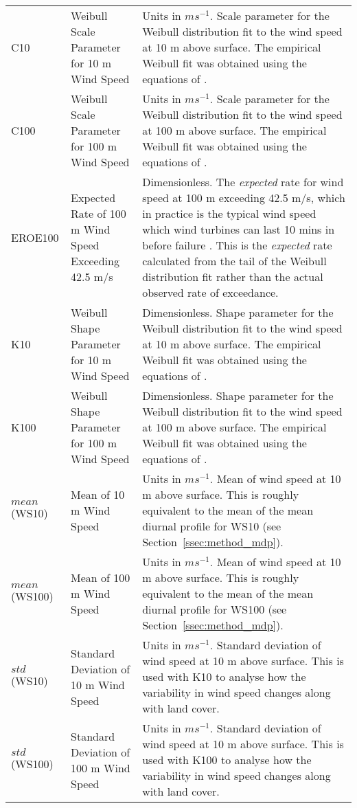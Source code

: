\begin{landscape}
\begin{longtable}{P{2cm}P{3cm}P{15cm}}
			C10 & Weibull Scale Parameter for 10 m Wind Speed & Units in $m s^{-1}$. Scale parameter for the Weibull distribution fit to the wind speed at 10 m above surface. The empirical Weibull fit was obtained using the equations of \citep{justus1977}. \\
			C100 & Weibull Scale Parameter for 100 m Wind Speed & Units in $m s^{-1}$. Scale parameter for the Weibull distribution fit to the wind speed at 100 m above surface. The empirical Weibull fit was obtained using the equations of \citep{justus1977}. \\
			EROE100 & Expected Rate of 100 m Wind Speed Exceeding 42.5 m/s & Dimensionless. The \textit{expected} rate for wind speed at 100 m exceeding 42.5 m/s, which in practice is the typical wind speed which wind turbines can last 10 mins in before failure \citep{chen2015, chen2016, ge_web}. This is the \textit{expected} rate calculated from the tail of the Weibull distribution fit rather than the actual observed rate of exceedance. \\
			K10 & Weibull Shape Parameter for 10 m Wind Speed & Dimensionless. Shape parameter for the Weibull distribution fit to the wind speed at 10 m above surface. The empirical Weibull fit was obtained using the equations of \citep{justus1977}. \\
			K100 & Weibull Shape Parameter for 100 m Wind Speed & Dimensionless. Shape parameter for the Weibull distribution fit to the wind speed at 100 m above surface. The empirical Weibull fit was obtained using the equations of \citep{justus1977}. \\
			$mean$(WS10) & Mean of 10 m Wind Speed & Units in $m s^{-1}$. Mean of wind speed at 10 m above surface. This is roughly equivalent to the mean of the mean diurnal profile for WS10 (see Section~\ref{ssec:method_mdp}). \\
			$mean$(WS100) & Mean of 100 m Wind Speed & Units in $m s^{-1}$. Mean of wind speed at 10 m above surface. This is roughly equivalent to the mean of the mean diurnal profile for WS100 (see Section~\ref{ssec:method_mdp}). \\
			$std$(WS10) & Standard Deviation of 10 m Wind Speed & Units in $m s^{-1}$. Standard deviation of wind speed at 10 m above surface. This is used with K10 to analyse how the variability in wind speed changes along with land cover. \\
			$std$(WS100) & Standard Deviation of 100 m Wind Speed & Units in $m s^{-1}$. Standard deviation of wind speed at 10 m above surface. This is used with K100 to analyse how the variability in wind speed changes along with land cover. \\

\end{longtable}
\end{landscape}
